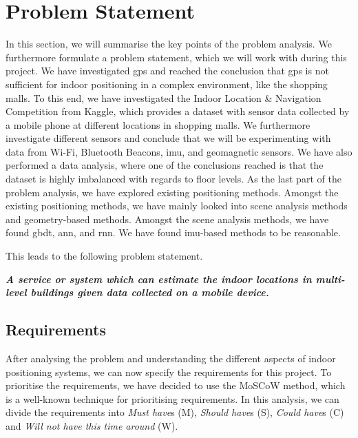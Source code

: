 \section{Problem Statement} \label{sec:problemstatement}
In this section, we will summarise the key points of the problem analysis. We furthermore formulate a problem statement, which we will work with during this project. We have investigated \gls{gps} and reached the conclusion that \gls{gps} is not sufficient for indoor positioning in a complex environment, like the shopping malls. To this end, we have investigated the Indoor Location \& Navigation Competition from Kaggle, which provides a dataset with sensor data collected by a mobile phone at different locations in shopping malls. We furthermore investigate different sensors and conclude that we will be experimenting with data from Wi-Fi, Bluetooth Beacons, \gls{imu}, and geomagnetic sensors. We have also performed a data analysis, where one of the conclusions reached is that the dataset is highly imbalanced with regards to floor levels. As the last part of the problem analysis, we have explored existing positioning methods. Amongst the existing positioning methods, we have mainly looked into scene analysis methods and geometry-based methods. Amongst the scene analysis methods, we have found \gls{gbdt}, \gls{ann}, and \gls{rnn}. We have found \gls{imu}-based methods to be reasonable.

This leads to the following problem statement.
\begin{center}
    \textbf{\textit{A service or system which can estimate the indoor locations in multi-level buildings given data collected on a mobile device.}}
\end{center}

\subsection{Requirements} \label{sec:requirements}
After analysing the problem and understanding the different aspects of indoor positioning systems, we can now specify the requirements for this project. To prioritise the requirements, we have decided to use the MoSCoW method, which is a well-known technique for prioritising requirements. In this analysis, we can divide the requirements into \textit{Must have}s (M), \textit{Should have}s (S), \textit{Could have}s (C) and \textit{Will not have this time around} (W).\cite[140]{davidbenyon2013}

